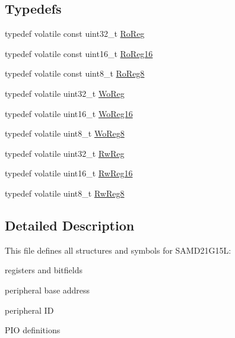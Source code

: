 \subsection*{Typedefs}
\begin{DoxyCompactItemize}
\item 
typedef volatile const uint32\+\_\+t \mbox{\hyperlink{group___s_a_m_d21_g15_l__definitions_ga5d556f8391af4141be23f7334ac9dd68}{Ro\+Reg}}
\item 
typedef volatile const uint16\+\_\+t \mbox{\hyperlink{group___s_a_m_d21_g15_l__definitions_gaebf6e33c2d49a802e06e22a95ea9d0d0}{Ro\+Reg16}}
\item 
typedef volatile const uint8\+\_\+t \mbox{\hyperlink{group___s_a_m_d21_g15_l__definitions_ga0d957f1433aaf5d70e4dc2b68288442d}{Ro\+Reg8}}
\item 
typedef volatile uint32\+\_\+t \mbox{\hyperlink{group___s_a_m_d21_g15_l__definitions_gac0f96d4e8018367b38f527007cf0eafd}{Wo\+Reg}}
\item 
typedef volatile uint16\+\_\+t \mbox{\hyperlink{group___s_a_m_d21_g15_l__definitions_ga0ab0e5f6c8301aa1c2068e511d854094}{Wo\+Reg16}}
\item 
typedef volatile uint8\+\_\+t \mbox{\hyperlink{group___s_a_m_d21_g15_l__definitions_ga5e336e5a36ee12ebeafb021108e5275b}{Wo\+Reg8}}
\item 
typedef volatile uint32\+\_\+t \mbox{\hyperlink{group___s_a_m_d21_g15_l__definitions_gacf1496e3bbe303e55f627fc7558a68c7}{Rw\+Reg}}
\item 
typedef volatile uint16\+\_\+t \mbox{\hyperlink{group___s_a_m_d21_g15_l__definitions_gacce07556c80fc352ae607f225f19fed5}{Rw\+Reg16}}
\item 
typedef volatile uint8\+\_\+t \mbox{\hyperlink{group___s_a_m_d21_g15_l__definitions_gae361754be775bb192f85821d3ab33c17}{Rw\+Reg8}}
\end{DoxyCompactItemize}


\subsection{Detailed Description}
This file defines all structures and symbols for S\+A\+M\+D21\+G15L\+:
\begin{DoxyItemize}
\item registers and bitfields
\item peripheral base address
\item peripheral ID
\item P\+IO definitions 
\end{DoxyItemize}

